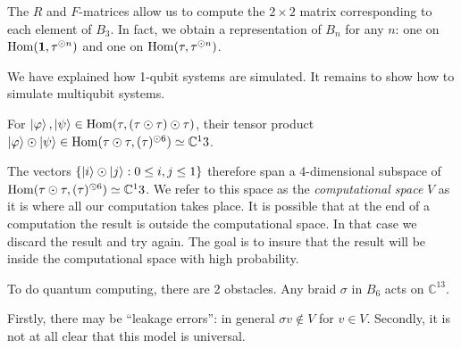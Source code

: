 The $R$ and $F$-matrices allow us to compute the $2 \times 2$ matrix
corresponding to each element of $B_3$. In fact, we obtain a representation of
$B_n$ for any $n$: one on $\operatorname{Hom}(\mathbf{1}, \tau^{\odot n})$ and one on
$\operatorname{Hom}(\tau, \tau^{\odot n})$.

We have explained how 1-qubit systems are simulated. It remains to show how to simulate multiqubit systems.

For $\left|\varphi\right>,\left|\psi\right>\in \operatorname{Hom}(\tau,(\tau \odot \tau) \odot \tau)$,
their tensor product $\left|\varphi\right> \odot \left|\psi\right> \in \operatorname{Hom}(\tau \odot
\tau, (\tau)^{\odot 6}) \simeq \mathbb{C}^13$. 

The vectors $\left\{ \left|i\right>\odot \left|j\right> : 0 \leq i,j\leq 1 \right\}$
therefore span a 4-dimensional subspace of $\operatorname{Hom}(\tau \odot \tau, (\tau)^{\odot
6}) \simeq \mathbb{C}^13$. We refer to this space as the \emph{computational
space} $V$ as it is where all our computation takes place. It is possible that at
the end of a computation the result is outside the computational space.  In
that case we discard the result and try again. The goal is to insure that the
result will be inside the computational space with high probability. 

To do quantum computing, there are 2 obstacles. Any braid $\sigma$ in $B_6$
acts on $\mathbb{C}^13$. 

Firstly, there may be ``leakage errors'': in general $\sigma v \notin V$ for $v \in V$. 
Secondly, it is not at all clear that this model is universal. 

